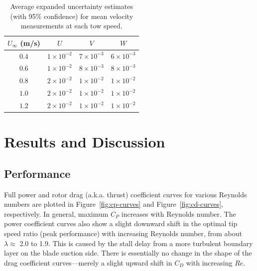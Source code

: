 \documentclass[energies,article,accept,moreauthors,pdftex,12pt,a4paper]{mdpi}
\begin{document}
\begin{table}
    \centering
\begin{tabular}{cccc}
$U_\infty$ (m/s) &                $U$ &                $V$ &                $W$ \\
\hline
           $0.4$ & $1 \times 10^{-2}$ & $7 \times 10^{-3}$ & $6 \times 10^{-3}$ \\
           $0.6$ & $1 \times 10^{-2}$ & $8 \times 10^{-3}$ & $8 \times 10^{-3}$ \\
           $0.8$ & $2 \times 10^{-2}$ & $1 \times 10^{-2}$ & $1 \times 10^{-2}$ \\
           $1.0$ & $2 \times 10^{-2}$ & $1 \times 10^{-2}$ & $1 \times 10^{-2}$ \\
           $1.2$ & $2 \times 10^{-2}$ & $1 \times 10^{-2}$ & $1 \times 10^{-2}$ \\
\end{tabular}
\caption{Average expanded uncertainty estimates (with 95\% confidence) for mean
    velocity measurements at each tow speed.} 

\label{tab:vel-unc}
\end{table}


\section{Results and Discussion}


\subsection{Performance}

Full power and rotor drag (a.k.a. thrust) coefficient curves for various
Reynolds numbers are plotted in Figure~\ref{fig:cp-curves} and
Figure~\ref{fig:cd-curves}, respectively. In general, maximum $C_P$ increases
with Reynolds number. The power coefficient curves also show a slight downward
shift in the optimal tip speed ratio (peak performance) with increasing Reynolds
number, from about $\lambda \approx$ 2.0 to 1.9. This is caused by the stall
delay from a more turbulent boundary layer on the blade suction side. There is
essentially no change in the shape of the drag coefficient curves---merely a
slight upward shift in $C_D$ with increasing $Re$.
\end{document}
